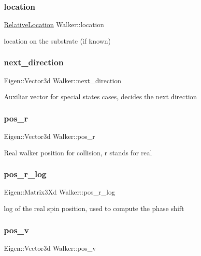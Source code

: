 \subsubsection{\texorpdfstring{location}{location}}
{\footnotesize\ttfamily \hyperlink{class_walker_a24246136a10754791b05cb570dbb8417}{Relative\+Location} Walker\+::location}

location on the substrate (if known) \mbox{\label{class_walker_ad1629485a13c80367a563ed7b88149eb}} 
\subsubsection{\texorpdfstring{next\+\_\+direction}{next\_direction}}
{\footnotesize\ttfamily Eigen\+::\+Vector3d Walker\+::next\+\_\+direction}

Auxiliar vector for special states cases, decides the next direction \mbox{\label{class_walker_a1008a95833c1f74b53f02e57e84417b7}} 
\subsubsection{\texorpdfstring{pos\+\_\+r}{pos\_r}}
{\footnotesize\ttfamily Eigen\+::\+Vector3d Walker\+::pos\+\_\+r}

Real walker position for collision, r stands for real \mbox{\label{class_walker_a1ba5a46fddf62eb3eeaabc7c868afe07}} 
\subsubsection{\texorpdfstring{pos\+\_\+r\+\_\+log}{pos\_r\_log}}
{\footnotesize\ttfamily Eigen\+::\+Matrix3\+Xd Walker\+::pos\+\_\+r\+\_\+log}

log of the real spin position, used to compute the phase shift \mbox{\label{class_walker_a2c1bf5a8da9e8f3a230a22ab4ae0e373}} 
\subsubsection{\texorpdfstring{pos\+\_\+v}{pos\_v}}
{\footnotesize\ttfamily Eigen\+::\+Vector3d Walker\+::pos\+\_\+v}

